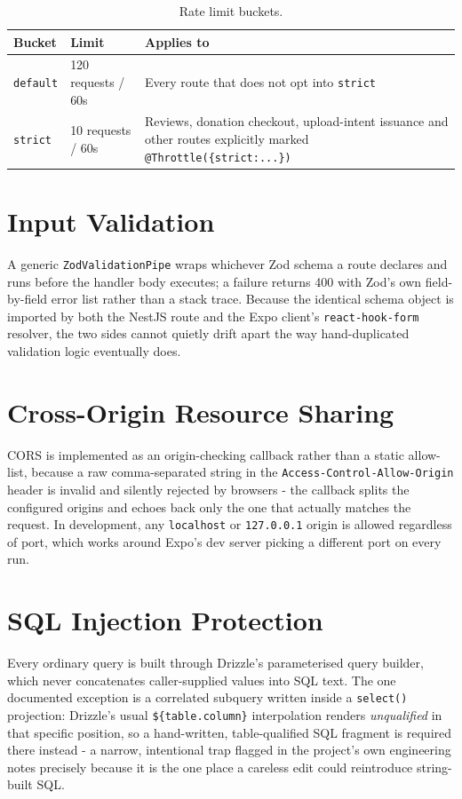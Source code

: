 \begin{table}[H]\centering
\caption{Rate limit buckets.}
\label{tab:rate-limits}
\begin{tabularx}{\textwidth}{|p{}|p{}|Y|}
\hline
\textbf{Bucket} & \textbf{Limit} & \textbf{Applies to}\\\hline
\texttt{default} & 120 requests / 60s & Every route that does not opt into \texttt{strict}\\\hline
\texttt{strict} & 10 requests / 60s & Reviews, donation checkout, upload-intent issuance and other routes explicitly marked \texttt{@Throttle(\{strict:...\})}\\\hline
\end{tabularx}
\end{table}

\section{Input Validation}
\label{sec:validation-internals}
A generic \texttt{ZodValidationPipe} wraps whichever Zod schema a route declares and runs before the handler body executes; a failure returns 400 with Zod's own field-by-field error list rather than a stack trace. Because the identical schema object is imported by both the NestJS route and the Expo client's \texttt{react-hook-form} resolver, the two sides cannot quietly drift apart the way hand-duplicated validation logic eventually does.

\section{Cross-Origin Resource Sharing}
\label{sec:cors-internals}
CORS is implemented as an origin-checking callback rather than a static allow-list, because a raw comma-separated string in the \texttt{Access-Control-Allow-Origin} header is invalid and silently rejected by browsers - the callback splits the configured origins and echoes back only the one that actually matches the request. In development, any \texttt{localhost} or \texttt{127.0.0.1} origin is allowed regardless of port, which works around Expo's dev server picking a different port on every run.

\section{SQL Injection Protection}
\label{sec:sql-injection}
Every ordinary query is built through Drizzle's parameterised query builder, which never concatenates caller-supplied values into SQL text. The one documented exception is a correlated subquery written inside a \texttt{select()} projection: Drizzle's usual \texttt{\$\{table.column\}} interpolation renders \emph{unqualified} in that specific position, so a hand-written, table-qualified SQL fragment is required there instead - a narrow, intentional trap flagged in the project's own engineering notes precisely because it is the one place a careless edit could reintroduce string-built SQL.

